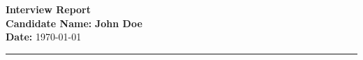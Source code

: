 \documentclass[a4paper,12pt]{article}
\newcommand{\sectionline}{\noindent\rule{\linewidth}{1pt}}
\begin{document}
\begin{center}
    \textbf{\LARGE\color{prepai-blue} Interview Report}\\[1em]
    \textbf{Candidate Name:} \textbf{John Doe}\\
    \textbf{Date:} \today\\
\end{center}

\sectionline %



\end{document}

